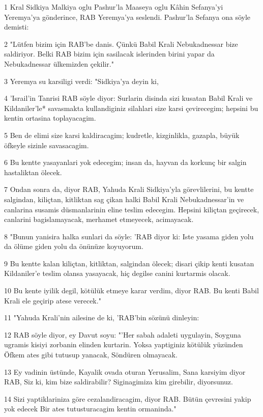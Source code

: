 \par 1 Kral Sidkiya Malkiya oglu Pashur'la Maaseya oglu Kâhin Sefanya'yi Yeremya'ya gönderince, RAB Yeremya'ya seslendi. Pashur'la Sefanya ona söyle demisti:
\par 2 "Lütfen bizim için RAB'be danis. Çünkü Babil Krali Nebukadnessar bize saldiriyor. Belki RAB bizim için sasilacak islerinden birini yapar da Nebukadnessar ülkemizden çekilir."
\par 3 Yeremya su karsiligi verdi: "Sidkiya'ya deyin ki,
\par 4 'Israil'in Tanrisi RAB söyle diyor: Surlarin disinda sizi kusatan Babil Krali ve Kildaniler'le* savasmakta kullandiginiz silahlari size karsi çevirecegim; hepsini bu kentin ortasina toplayacagim.
\par 5 Ben de elimi size karsi kaldiracagim; kudretle, kizginlikla, gazapla, büyük öfkeyle sizinle savasacagim.
\par 6 Bu kentte yasayanlari yok edecegim; insan da, hayvan da korkunç bir salgin hastaliktan ölecek.
\par 7 Ondan sonra da, diyor RAB, Yahuda Krali Sidkiya'yla görevlilerini, bu kentte salgindan, kiliçtan, kitliktan sag çikan halki Babil Krali Nebukadnessar'in ve canlarina susamis düsmanlarinin eline teslim edecegim. Hepsini kiliçtan geçirecek, canlarini bagislamayacak, merhamet etmeyecek, acimayacak.
\par 8 "Bunun yanisira halka sunlari da söyle: 'RAB diyor ki: Iste yasama giden yolu da ölüme giden yolu da önünüze koyuyorum.
\par 9 Bu kentte kalan kiliçtan, kitliktan, salgindan ölecek; disari çikip kenti kusatan Kildaniler'e teslim olansa yasayacak, hiç degilse canini kurtarmis olacak.
\par 10 Bu kente iyilik degil, kötülük etmeye karar verdim, diyor RAB. Bu kenti Babil Krali ele geçirip atese verecek."
\par 11 "Yahuda Krali'nin ailesine de ki, 'RAB'bin sözünü dinleyin:
\par 12 RAB söyle diyor, ey Davut soyu: "'Her sabah adaleti uygulayin, Soyguna ugramis kisiyi zorbanin elinden kurtarin. Yoksa yaptiginiz kötülük yüzünden Öfkem ates gibi tutusup yanacak, Söndüren olmayacak.
\par 13 Ey vadinin üstünde, Kayalik ovada oturan Yerusalim, Sana karsiyim diyor RAB, Siz ki, kim bize saldirabilir? Siginagimiza kim girebilir, diyorsunuz.
\par 14 Sizi yaptiklariniza göre cezalandiracagim, diyor RAB. Bütün çevresini yakip yok edecek Bir ates tutusturacagim kentin ormaninda."

